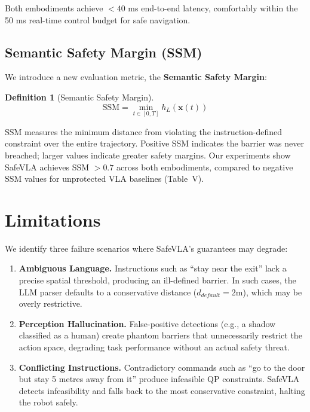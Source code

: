 \documentclass[conference]{IEEEtran}
\newtheorem{definition}{Definition}
\begin{document}
Both embodiments achieve $<40$ ms end-to-end latency, comfortably within the 50 ms real-time control budget for safe navigation.

\subsection{Semantic Safety Margin (SSM)}
We introduce a new evaluation metric, the \textbf{Semantic Safety Margin}:
\begin{definition}[Semantic Safety Margin]
\begin{equation}
\text{SSM} = \min_{t \in [0,T]} h_L(\mathbf{x}(t))
\end{equation}
\end{definition}
SSM measures the minimum distance from violating the instruction-defined constraint over the entire trajectory. Positive SSM indicates the barrier was never breached; larger values indicate greater safety margins. Our experiments show SafeVLA achieves SSM $> 0.7$ across both embodiments, compared to negative SSM values for unprotected VLA baselines (Table~V).

\section{Limitations}
We identify three failure scenarios where SafeVLA's guarantees may degrade:

\begin{enumerate}
    \item \textbf{Ambiguous Language.} Instructions such as ``stay near the exit'' lack a precise spatial threshold, producing an ill-defined barrier. In such cases, the LLM parser defaults to a conservative distance ($d_{default} = 2$m), which may be overly restrictive.
    \item \textbf{Perception Hallucination.} False-positive detections (e.g., a shadow classified as a human) create phantom barriers that unnecessarily restrict the action space, degrading task performance without an actual safety threat.
    \item \textbf{Conflicting Instructions.} Contradictory commands such as ``go to the door but stay 5 metres away from it'' produce infeasible QP constraints. SafeVLA detects infeasibility and falls back to the most conservative constraint, halting the robot safely.
\end{enumerate}
\end{document}
